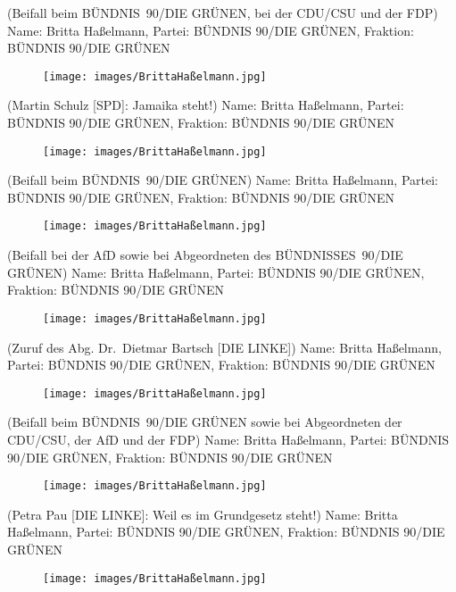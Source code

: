 \documentclass[10pt, a4paper]{report}
\begin{document}
(Beifall beim BÜNDNIS 90/DIE GRÜNEN, bei der CDU/CSU und der FDP)
Name: Britta Haßelmann, Partei: BÜNDNIS 90/DIE GRÜNEN, Fraktion: BÜNDNIS 90/DIE GRÜNEN

\begin{figure}[!ht]
\texttt{[image: images/BrittaHaßelmann.jpg]}
\end{figure}


(Martin Schulz [SPD]: Jamaika steht!)
Name: Britta Haßelmann, Partei: BÜNDNIS 90/DIE GRÜNEN, Fraktion: BÜNDNIS 90/DIE GRÜNEN

\begin{figure}[!ht]
\texttt{[image: images/BrittaHaßelmann.jpg]}
\end{figure}


(Beifall beim BÜNDNIS 90/DIE GRÜNEN)
Name: Britta Haßelmann, Partei: BÜNDNIS 90/DIE GRÜNEN, Fraktion: BÜNDNIS 90/DIE GRÜNEN

\begin{figure}[!ht]
\texttt{[image: images/BrittaHaßelmann.jpg]}
\end{figure}


(Beifall bei der AfD sowie bei Abgeordneten des BÜNDNISSES 90/DIE GRÜNEN)
Name: Britta Haßelmann, Partei: BÜNDNIS 90/DIE GRÜNEN, Fraktion: BÜNDNIS 90/DIE GRÜNEN

\begin{figure}[!ht]
\texttt{[image: images/BrittaHaßelmann.jpg]}
\end{figure}


(Zuruf des Abg. Dr. Dietmar Bartsch [DIE LINKE])
Name: Britta Haßelmann, Partei: BÜNDNIS 90/DIE GRÜNEN, Fraktion: BÜNDNIS 90/DIE GRÜNEN

\begin{figure}[!ht]
\texttt{[image: images/BrittaHaßelmann.jpg]}
\end{figure}


(Beifall beim BÜNDNIS 90/DIE GRÜNEN sowie bei Abgeordneten der CDU/CSU, der AfD und der FDP)
Name: Britta Haßelmann, Partei: BÜNDNIS 90/DIE GRÜNEN, Fraktion: BÜNDNIS 90/DIE GRÜNEN

\begin{figure}[!ht]
\texttt{[image: images/BrittaHaßelmann.jpg]}
\end{figure}


(Petra Pau [DIE LINKE]: Weil es im Grundgesetz steht!)
Name: Britta Haßelmann, Partei: BÜNDNIS 90/DIE GRÜNEN, Fraktion: BÜNDNIS 90/DIE GRÜNEN

\begin{figure}[!ht]
\texttt{[image: images/BrittaHaßelmann.jpg]}
\end{figure}
\end{document}
